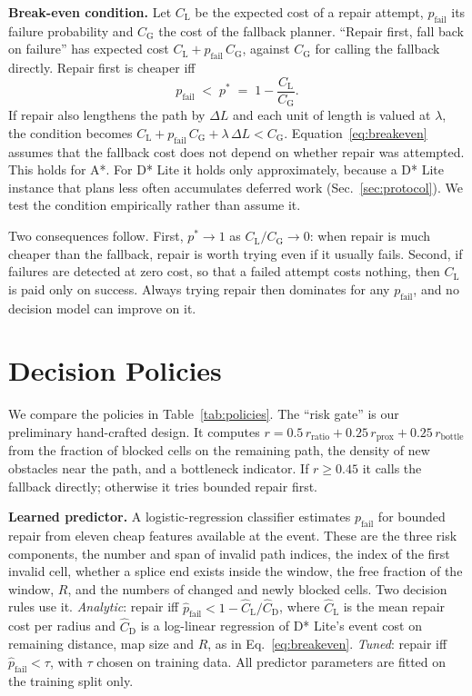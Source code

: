 \documentclass[11pt,a4paper]{article}
\newcommand{\CL}{C_{\mathrm{L}}}
\newcommand{\CG}{C_{\mathrm{G}}}
\newcommand{\pfail}{p_{\mathrm{fail}}}
\begin{document}
\textbf{Break-even condition.} Let $\CL$ be the expected cost of a repair attempt, $\pfail$ its failure probability and $\CG$ the cost of the fallback planner. ``Repair first, fall back on failure'' has expected cost $\CL + \pfail\,\CG$, against $\CG$ for calling the fallback directly. Repair first is cheaper iff
\begin{equation}
  \pfail \;<\; p^\ast \;=\; 1 - \frac{\CL}{\CG}.
  \label{eq:breakeven}
\end{equation}
If repair also lengthens the path by $\Delta L$ and each unit of length is valued at $\lambda$, the condition becomes $\CL + \pfail\,\CG + \lambda\,\Delta L < \CG$. Equation~\eqref{eq:breakeven} assumes that the fallback cost does not depend on whether repair was attempted. This holds for A*. For D* Lite it holds only approximately, because a D* Lite instance that plans less often accumulates deferred work (Sec.~\ref{sec:protocol}). We test the condition empirically rather than assume it.

Two consequences follow. First, $p^\ast \to 1$ as $\CL/\CG\to 0$: when repair is much cheaper than the fallback, repair is worth trying even if it usually fails. Second, if failures are detected at zero cost, so that a failed attempt costs nothing, then $\CL$ is paid only on success. Always trying repair then dominates for any $\pfail$, and no decision model can improve on it.

\section{Decision Policies}\label{sec:policies}
We compare the policies in Table~\ref{tab:policies}. The ``risk gate'' is our preliminary hand-crafted design. It computes $r = 0.5\,r_{\text{ratio}} + 0.25\,r_{\text{prox}} + 0.25\,r_{\text{bottle}}$ from the fraction of blocked cells on the remaining path, the density of new obstacles near the path, and a bottleneck indicator. If $r\ge 0.45$ it calls the fallback directly; otherwise it tries bounded repair first.

\textbf{Learned predictor.} A logistic-regression classifier estimates $\pfail$ for bounded repair from eleven cheap features available at the event. These are the three risk components, the number and span of invalid path indices, the index of the first invalid cell, whether a splice end exists inside the window, the free fraction of the window, $R$, and the numbers of changed and newly blocked cells. Two decision rules use it. \emph{Analytic}: repair iff $\hat p_{\text{fail}} < 1-\hat C_{\mathrm L}/\hat C_{\mathrm D}$, where $\hat C_{\mathrm L}$ is the mean repair cost per radius and $\hat C_{\mathrm D}$ is a log-linear regression of D* Lite's event cost on remaining distance, map size and $R$, as in Eq.~\eqref{eq:breakeven}. \emph{Tuned}: repair iff $\hat p_{\text{fail}} < \tau$, with $\tau$ chosen on training data. All predictor parameters are fitted on the training split only.
\end{document}
